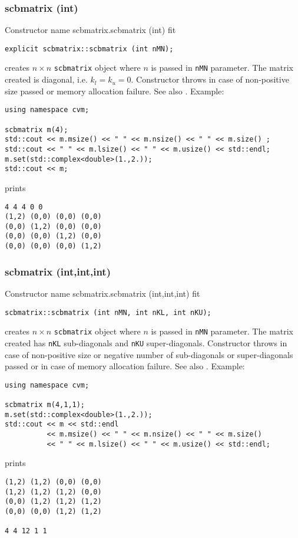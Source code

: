 \subsubsection{scbmatrix (int)}
Constructor%
\pdfdest name {scbmatrix.scbmatrix (int)} fit
\begin{verbatim}
explicit scbmatrix::scbmatrix (int nMN);
\end{verbatim}
creates  $n\times n$ \verb"scbmatrix" object where $n$ is passed in
\verb"nMN" parameter. The matrix created is diagonal, i.e. $k_l=k_u=0$.
Constructor throws  
in case of non-positive size passed or memory allocation failure.
See also .
Example:
\begin{Verbatim}
using namespace cvm;

scbmatrix m(4);
std::cout << m.msize() << " " << m.nsize() << " " << m.size() ;
std::cout << " " << m.lsize() << " " << m.usize() << std::endl;
m.set(std::complex<double>(1.,2.));
std::cout << m;
\end{Verbatim}
prints
\begin{Verbatim}
4 4 4 0 0
(1,2) (0,0) (0,0) (0,0)
(0,0) (1,2) (0,0) (0,0)
(0,0) (0,0) (1,2) (0,0)
(0,0) (0,0) (0,0) (1,2)
\end{Verbatim}
\newpage




\subsubsection{scbmatrix (int,int,int)}
Constructor%
\pdfdest name {scbmatrix.scbmatrix (int,int,int)} fit
\begin{verbatim}
scbmatrix::scbmatrix (int nMN, int nKL, int nKU);
\end{verbatim}
creates  $n\times n$ \verb"scbmatrix" object where $n$ is passed in
\verb"nMN" parameter. The matrix created has \verb"nKL" 
sub-diagonals and \verb"nKU" super-diagonals.
Constructor throws  
in case of non-positive size or negative number 
of sub-diagonals or super-diagonals
passed or in case of memory allocation failure.
See also .
Example:
\begin{Verbatim}
using namespace cvm;

scbmatrix m(4,1,1);
m.set(std::complex<double>(1.,2.));
std::cout << m << std::endl
          << m.msize() << " " << m.nsize() << " " << m.size()
          << " " << m.lsize() << " " << m.usize() << std::endl;
\end{Verbatim}
prints
\begin{Verbatim}
(1,2) (1,2) (0,0) (0,0)
(1,2) (1,2) (1,2) (0,0)
(0,0) (1,2) (1,2) (1,2)
(0,0) (0,0) (1,2) (1,2)

4 4 12 1 1
\end{Verbatim}
\newpage




